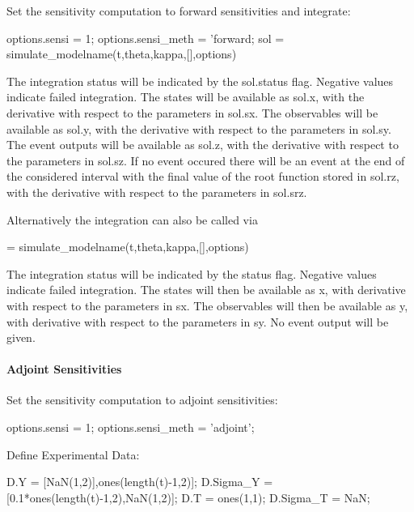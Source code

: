 Set the sensitivity computation to forward sensitivities and integrate\+: \begin{DoxyVerb}options.sensi = 1;
options.sensi_meth = 'forward;
sol = simulate_modelname(t,theta,kappa,[],options)
\end{DoxyVerb}


The integration status will be indicated by the {\ttfamily sol.\+status} flag. Negative values indicate failed integration. The states will be available as {\ttfamily sol.\+x}, with the derivative with respect to the parameters in {\ttfamily sol.\+sx}. The observables will be available as {\ttfamily sol.\+y}, with the derivative with respect to the parameters in {\ttfamily sol.\+sy}. The event outputs will be available as {\ttfamily sol.\+z}, with the derivative with respect to the parameters in {\ttfamily sol.\+sz}. If no event occured there will be an event at the end of the considered interval with the final value of the root function stored in {\ttfamily sol.\+rz}, with the derivative with respect to the parameters in {\ttfamily sol.\+srz}.

Alternatively the integration can also be called via \begin{DoxyVerb}[status,t,x,y,sx,sy] = simulate_modelname(t,theta,kappa,[],options)
\end{DoxyVerb}


The integration status will be indicated by the status flag. Negative values indicate failed integration. The states will then be available as {\ttfamily x}, with derivative with respect to the parameters in {\ttfamily sx}. The observables will then be available as {\ttfamily y}, with derivative with respect to the parameters in {\ttfamily sy}. No event output will be given.

\paragraph*{Adjoint Sensitivities}

Set the sensitivity computation to adjoint sensitivities\+: \begin{DoxyVerb}options.sensi = 1;
options.sensi_meth = 'adjoint';
\end{DoxyVerb}


Define Experimental Data\+: \begin{DoxyVerb}D.Y = [NaN(1,2)],ones(length(t)-1,2)];
D.Sigma_Y = [0.1*ones(length(t)-1,2),NaN(1,2)];
D.T = ones(1,1);
D.Sigma_T = NaN;
\end{DoxyVerb}


